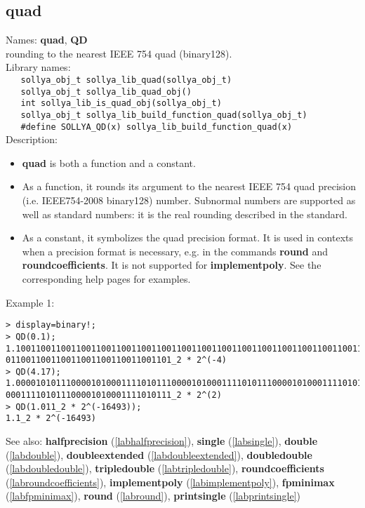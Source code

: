 \subsection{quad}
\label{labquad}
\noindent Names: \textbf{quad}, \textbf{QD}\\
\phantom{aaa}rounding to the nearest IEEE 754 quad (binary128).\\[0.2cm]
\noindent Library names:\\
\verb|   sollya_obj_t sollya_lib_quad(sollya_obj_t)|\\
\verb|   sollya_obj_t sollya_lib_quad_obj()|\\
\verb|   int sollya_lib_is_quad_obj(sollya_obj_t)|\\
\verb|   sollya_obj_t sollya_lib_build_function_quad(sollya_obj_t)|\\
\verb|   #define SOLLYA_QD(x) sollya_lib_build_function_quad(x)|\\[0.2cm]
\noindent Description: \begin{itemize}

\item \textbf{quad} is both a function and a constant.

\item As a function, it rounds its argument to the nearest IEEE 754 quad precision (i.e. IEEE754-2008 binary128) number.
   Subnormal numbers are supported as well as standard numbers: it is the real
   rounding described in the standard.

\item As a constant, it symbolizes the quad precision format. It is used in 
   contexts when a precision format is necessary, e.g. in the commands 
   \textbf{round} and \textbf{roundcoefficients}. It is not supported for \textbf{implementpoly}.
   See the corresponding help pages for examples.
\end{itemize}
\noindent Example 1: 
\begin{center}\begin{minipage}{15cm}\begin{Verbatim}[frame=single]
> display=binary!;
> QD(0.1);
1.100110011001100110011001100110011001100110011001100110011001100110011001100110
011001100110011001100110011001101_2 * 2^(-4)
> QD(4.17);
1.000010101110000101000111101011100001010001111010111000010100011110101110000101
000111101011100001010001111010111_2 * 2^(2)
> QD(1.011_2 * 2^(-16493));
1.1_2 * 2^(-16493)
\end{Verbatim}
\end{minipage}\end{center}
See also: \textbf{halfprecision} (\ref{labhalfprecision}), \textbf{single} (\ref{labsingle}), \textbf{double} (\ref{labdouble}), \textbf{doubleextended} (\ref{labdoubleextended}), \textbf{doubledouble} (\ref{labdoubledouble}), \textbf{tripledouble} (\ref{labtripledouble}), \textbf{roundcoefficients} (\ref{labroundcoefficients}), \textbf{implementpoly} (\ref{labimplementpoly}), \textbf{fpminimax} (\ref{labfpminimax}), \textbf{round} (\ref{labround}), \textbf{printsingle} (\ref{labprintsingle})
